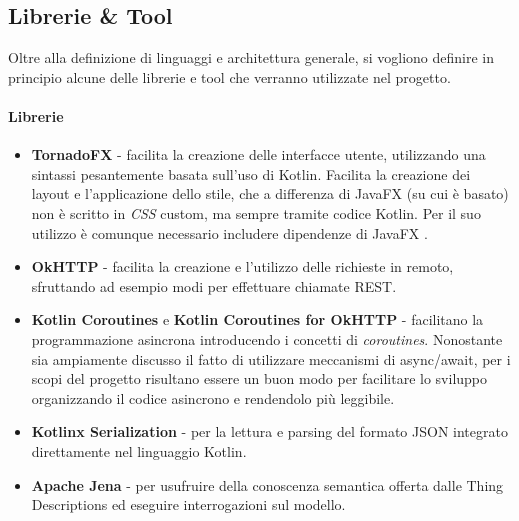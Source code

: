 \documentclass[12pt,a4paper,openright,oneside]{report}
\begin{document}
\subsection{Librerie \& Tool}
Oltre alla definizione di linguaggi e architettura generale, si vogliono definire in principio alcune delle librerie e tool che verranno utilizzate nel progetto.

\paragraph{Librerie}
\begin{itemize}
	\item \textbf{TornadoFX} \cite{tornadofx} - facilita la creazione delle interfacce utente, utilizzando una sintassi pesantemente basata sull'uso di Kotlin. Facilita la creazione dei layout e l'applicazione dello stile, che a differenza di JavaFX (su cui è basato) non è scritto in \textit{CSS} custom, ma sempre tramite codice Kotlin. Per il suo utilizzo è comunque necessario includere dipendenze di JavaFX \cite{javafx}.
	
	\item \textbf{OkHTTP} \cite{okhttp} - facilita la creazione e l'utilizzo delle richieste in remoto, sfruttando ad esempio modi per effettuare chiamate REST.
	
	\item \textbf{Kotlin Coroutines} e \textbf{Kotlin Coroutines for OkHTTP} \cite{coroutines} - facilitano la programmazione asincrona introducendo i concetti di \textit{coroutines}. Nonostante sia ampiamente discusso il fatto di utilizzare meccanismi di async/await, per i scopi del progetto risultano essere un buon modo per facilitare lo sviluppo organizzando il codice asincrono e rendendolo più leggibile. 
	
	\item \textbf{Kotlinx Serialization} \cite{coroutines} - per la lettura e parsing del formato JSON integrato direttamente nel linguaggio Kotlin.
	
	\item \textbf{Apache Jena} \cite{jena} - per usufruire della conoscenza semantica offerta dalle Thing Descriptions ed eseguire interrogazioni sul modello.
\end{itemize}
	
\end{document}

